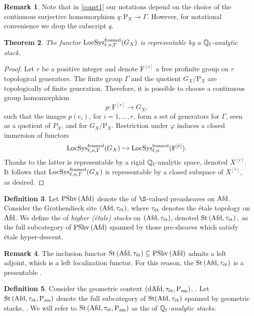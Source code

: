 \documentclass[10pt,a4paper]{amsart}
\numberwithin{equation}{subsection}
\theoremstyle{plain}
\newtheorem{theorem}{Theorem}[section]
\theoremstyle{definition}
\newtheorem{defi}[theorem]{Definition}
\newtheorem{rema}[theorem]{Remark}
\theoremstyle{remark}
\numberwithin{equation}{section}
\begin{document}
\begin{rema}
Note that in \cref{const1} our notations depend on the choice of the continuous surjective homomorphism $q \colon \mathrm P_X \to \Gamma$. However, for notational convenience we drop the subscript $q$.
\end{rema}

\begin{theorem} \label{hom_loc}
The functor $\mathrm{LocSys}_{\ell, n, \Gamma}^{\mathrm{framed}}(G_X)$ is representable by a $\mathbb{Q}_{\ell}$-analytic stack.
\end{theorem}

\begin{proof} Let $r$ be a positive integer and denote $\mathrm F^{[r]}$ a free profinite group on $r$ topological generators.
The finite group $\Gamma$ and the quotient $G_X / \mathrm P_X $ are topologically of finite generation. Therefore, it is possible to choose
a continuous group homomorphism 
	\[
		p \colon \mathrm F^{[r]} \to G_X,
	\]
such that the images $p(e_i)$, for $i = 1, \dots, r$, form a set of generators for $\Gamma$, seen as a quotient of $P_{X}$, and for  $G_X / \mathrm P_X$.
Restriction under $\varphi$ induces a closed immersion of functors 
	\[
		\mathrm{LocSys}_{\ell, n, \Gamma}^{\mathrm{framed}}(G_X) \hookrightarrow \mathrm{LocSys}_{\ell, n}^{\mathrm{framed}}(\mathrm F^{[r]}).
	\]
Thanks to \cite[Theorem
2.2.15.]{me1} the latter
is representable by a rigid $\mathbb{Q}_\ell$-analytic space, denoted $X^{[r]}$. It follows that $\mathrm{LocSys}_{\ell, n, \Gamma}^{\mathrm{framed}}(G_X)$ is representable by a closed subspace of $X^{[r]}$, as desired.
\end{proof}

\begin{defi} \label{const_1}
Let $\mathrm{PShv} \left( \mathrm{Afd}
\right)$ denote the \infcat of $\S$-valued preasheaves on $\mathrm{Afd}$.
Consider the Grothendieck site $( \mathrm{Afd}, \tau_{\text{\'et}})$, where $\tau_{\text{\'et}}$ denotes the \'etale topology on $\mathrm{Afd}$. We define the \infcat of \emph{higher (\'etale) stacks} on $(\mathrm{Afd}, \tau_{\text{\'et}})$, denoted $\mathrm{St} \left( \mathrm{Afd}, \tau_{\text{\'et}} \right),
$ as the full subcategory of $\mathrm{PShv} \left( \mathrm{Afd} \right)$ spanned by those pre-sheaves which satisfy \'etale hyper-descent.
\end{defi}

\begin{rema}
The inclusion functor $ \mathrm{St} \left( \mathrm{Afd}, \tau_{\text{\'et}} \right) \subseteq \mathrm{PShv} \left( \mathrm{Afd} \right)$ admits a left adjoint, which is a left localization functor. For this reason, the \infcat $\mathrm{St} \left( \mathrm{Afd}, \tau_{\text{\'et}} \right)$ is a presentable \infcat.
\end{rema}

\begin{defi}
Consider the geometric context $(\mathrm{dAfd}, \tau_{\text{\'et}}, \mathrm P_{\mathrm{sm}} )$, \cite[Definition 2.3.1]{me1}. Let $\mathrm{St} \left( \mathrm{Afd}, \tau_{\text{\'et}}, \mathrm P_{\mathrm{sm}} \right)$ denote the full subcategory of $\mathrm{St}( \mathrm{Afd}, \tau_{\text{\'et}})$
spanned by geometric stacks, \cite[Definition 2.3.2]{me1}. We will refer to $\mathrm{St} \left( \mathrm{Afd}, \tau_{\text{\'et}}, \mathrm P_{\mathrm{sm}} \right)$ as the \infcat of \emph{$\mathbb{Q}_\ell$-analytic stacks}.
\end{defi}
\end{document}
